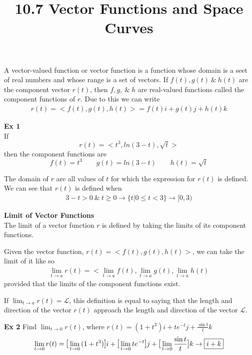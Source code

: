 \documentclass{article}
\title{10.7 Vector Functions and Space Curves}
\begin{document}
  \maketitle
  A vector-valued function or vector function is a function whose domain is a seet of real numbers and whose range is a set of vectors. If $ f(t), g(t) ~\&~ h(t) $ are the component vector $ r(t) $, then $ f,g,~\&~ h $ are real-valued functions called the component functions of $ r $. Due to this we can write
  \[
    \begin{gathered}
    r(t)=< f(t), g(t), h(t)>=f(t)i + g(t)j + h(t)k 
    \end{gathered}
  \]

  \textbf{Ex 1}\\
  If
  \[
    r(t)=< t^{3}, ln(3-t), \sqrt{t}> 
  \]
  then the component functions are
  \[
    f(t)=t^{3} \qquad g(t)=ln(3-t) \qquad h(t)=\sqrt{t}  
  \]
 
  The domain of $ r $ are all values of $ t $ for which the expression for $ r(t) $ is defined. We can see that $ r(t) $ is defined when
  \[
    \begin{gathered}
      3-t>0 ~\&~t\ge 0 \to \{t|0\le t <3\} \to [0,3)
    \end{gathered}
  \]
 
  \textbf{Limit of Vector Functions}\\
  The limit of a vector function $ r $ is defined by taking the limits of its component functions. 

  Given the vector function, $r(t)=< f(t), g(t), h(t)>$, we can take the limit of it like so
  \[
    \begin{gathered}
    \lim_{ t \to a}{r(t)}= < \lim_{t \to a}{f(t)}, \lim_{t \to a}{g(t)}, \lim_{t \to a}{h(t)}  
    \end{gathered}
  \]
  provided that the limits of the component functions exist.

  If $ \lim_{t \to a}{r(t)} = \mathcal{L} $, this definition is equal to saying that the length and direction of the vector $ r(t) $ approach the length and direction of the vector $ \mathcal{L} $.
 
  \textbf{Ex 2}
  Find $ \lim_{t \to 0}{r(t)} $, where $ r(t)=(1+t^{3})i + te^{-t}j + \frac{\sin{t}}{t}k$ 
  \[
      \begin{gathered}
        \lim_{t \to 0}{r(t)}= \text{\large{[}} \lim_{t \to 0}{(1+t^{3} )} \text{\large{]}}i + \text{\large{[}} \lim_{t \to 0}{te^{-t} } \text{\large{]}}j + \text{\large{[}} \lim_{t \to 0}{\frac{\sin{t}}{t} } \text{\large{]}}k \to \boxed{i+k}
      \end{gathered}
  \]
 
\end{document}
